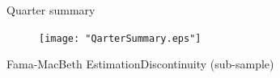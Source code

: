 \documentclass{beamer}
\begin{document}
\begin{frame}{Quarter summary}\label{Monthly21}
	
	
	
	
	

		\begin{figure}
			\centering  
			\texttt{[image: "QarterSummary.eps"]}
		\end{figure}

	
	
	
\end{frame}		
		
	\begin{frame}{Fama-MacBeth Estimation}{Discontinuity (sub-sample)}
		\label{Monthly9} 

\begin{table}[htbp]
	\centering
	\resizebox{0.8\textwidth}{!}{
		
	}
\end{table}			


		
		
	\end{frame}
	
\end{document}
